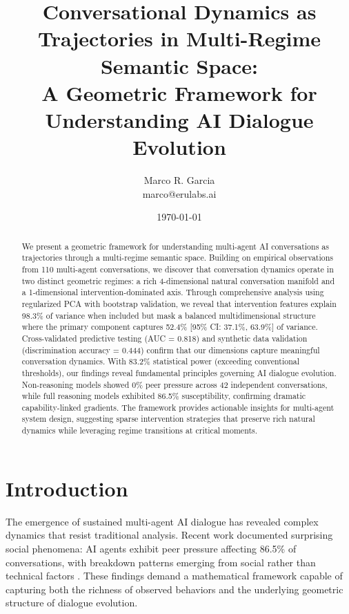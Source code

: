 \documentclass[11pt,letterpaper]{article}
\title{Conversational Dynamics as Trajectories in Multi-Regime Semantic Space: \\
\large A Geometric Framework for Understanding AI Dialogue Evolution}
\author{
Marco R. Garcia \\
marco@erulabs.ai
}
\date{\today}
\newcommand{\totalConversations}{110}
\newcommand{\nonReasoningCount}{42}
\newcommand{\powerOutcomeGroups}{83.2\%}
\newcommand{\allFeaturesPCOne}{98.3\%}  %
\newcommand{\nonInterventionPCOneVariance}{52.4\%}  %
\newcommand{\nonInterventionPCOneCILower}{37.1\%}
\newcommand{\nonInterventionPCOneCIUpper}{63.9\%}
\newcommand{\testAUC}{0.818}
\newcommand{\syntheticDiscriminationAccuracy}{0.444}
\newcommand{\fullReasoningPeerPressure}{86.5\%}
\begin{document}
\maketitle

\begin{abstract}
We present a geometric framework for understanding multi-agent AI conversations as trajectories through a multi-regime semantic space. Building on empirical observations from \totalConversations{} multi-agent conversations, we discover that conversation dynamics operate in two distinct geometric regimes: a rich 4-dimensional natural conversation manifold and a 1-dimensional intervention-dominated axis. Through comprehensive analysis using regularized PCA with bootstrap validation, we reveal that intervention features explain \allFeaturesPCOne{} of variance when included but mask a balanced multidimensional structure where the primary component captures \nonInterventionPCOneVariance{} [95\% CI: \nonInterventionPCOneCILower{}, \nonInterventionPCOneCIUpper{}] of variance. Cross-validated predictive testing (AUC = \testAUC{}) and synthetic data validation (discrimination accuracy = \syntheticDiscriminationAccuracy{}) confirm that our dimensions capture meaningful conversation dynamics. With \powerOutcomeGroups{} statistical power (exceeding conventional thresholds), our findings reveal fundamental principles governing AI dialogue evolution. Non-reasoning models showed 0\% peer pressure across \nonReasoningCount{} independent conversations, while full reasoning models exhibited \fullReasoningPeerPressure{} susceptibility, confirming dramatic capability-linked gradients. The framework provides actionable insights for multi-agent system design, suggesting sparse intervention strategies that preserve rich natural dynamics while leveraging regime transitions at critical moments.
\end{abstract}

\section{Introduction}

The emergence of sustained multi-agent AI dialogue has revealed complex dynamics that resist traditional analysis. Recent work documented surprising social phenomena: AI agents exhibit peer pressure affecting \fullReasoningPeerPressure{} of conversations, with breakdown patterns emerging from social rather than technical factors \citep{garcia2025peer}. These findings demand a mathematical framework capable of capturing both the richness of observed behaviors and the underlying geometric structure of dialogue evolution.
\end{document}
